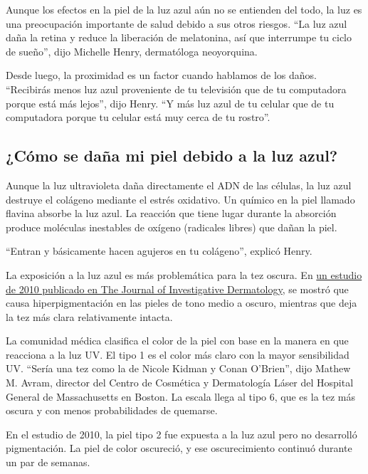 Aunque los efectos en la piel de la luz azul aún no se entienden del
todo, la luz es una preocupación importante de salud debido a sus otros
riesgos. ``La luz azul daña la retina y reduce la liberación de
melatonina, así que interrumpe tu ciclo de sueño'', dijo Michelle Henry,
dermatóloga neoyorquina.

Desde luego, la proximidad es un factor cuando hablamos de los daños.
``Recibirás menos luz azul proveniente de tu televisión que de tu
computadora porque está más lejos'', dijo Henry. ``Y más luz azul de tu
celular que de tu computadora porque tu celular está muy cerca de tu
rostro''.

\hypertarget{cuxf3mo-se-dauxf1a-mi-piel-debido-a-la-luz-azul}{%
\subsection{¿Cómo se daña mi piel debido a la luz
azul?}\label{cuxf3mo-se-dauxf1a-mi-piel-debido-a-la-luz-azul}}

Aunque la luz ultravioleta daña directamente el ADN de las células, la
luz azul destruye el colágeno mediante el estrés oxidativo. Un químico
en la piel llamado flavina absorbe la luz azul. La reacción que tiene
lugar durante la absorción produce moléculas inestables de oxígeno
(radicales libres) que dañan la piel.

``Entran y básicamente hacen agujeros en tu colágeno'', explicó Henry.

La exposición a la luz azul es más problemática para la tez oscura. En
\href{https://www.sciencedirect.com/science/article/pii/S0022202X15349307}{un
estudio de 2010 publicado en The Journal of Investigative Dermatology},
se mostró que causa hiperpigmentación en las pieles de tono medio a
oscuro, mientras que deja la tez más clara relativamente intacta.

La comunidad médica clasifica el color de la piel con base en la manera
en que reacciona a la luz UV. El tipo 1 es el color más claro con la
mayor sensibilidad UV. ``Sería una tez como la de Nicole Kidman y Conan
O'Brien'', dijo Mathew M. Avram, director del Centro de Cosmética y
Dermatología Láser del Hospital General de Massachusetts en Boston. La
escala llega al tipo 6, que es la tez más oscura y con menos
probabilidades de quemarse.

En el estudio de 2010, la piel tipo 2 fue expuesta a la luz azul pero no
desarrolló pigmentación. La piel de color oscureció, y ese
oscurecimiento continuó durante un par de semanas.

